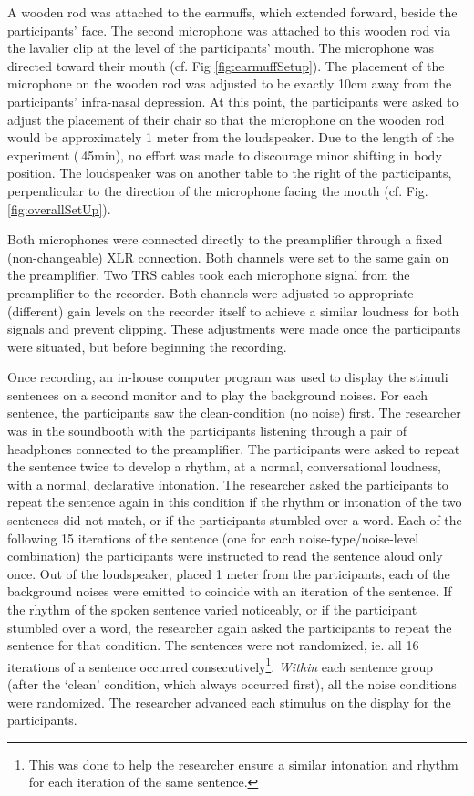 A wooden rod was attached to the earmuffs, which extended forward, beside the participants' face.  The second microphone was attached to this wooden rod via the lavalier clip at the level of the participants' mouth.  The microphone was directed toward their mouth (cf. Fig \ref{fig:earmuffSetup}).  
The placement of the microphone on the wooden rod was adjusted to be exactly 10cm away from the participants' infra-nasal depression.  At this point, the participants were asked to adjust the placement of their chair so that the microphone on the wooden rod would be approximately 1 meter from the loudspeaker. Due to the length of the experiment ($~$45min), no effort was made to discourage minor shifting in body position.  The loudspeaker was on another table to the right of the participants, perpendicular to the direction of the microphone facing the mouth (cf. Fig. \ref{fig:overallSetUp}).

Both microphones were connected directly to the preamplifier through a fixed (non-changeable) XLR connection.  Both channels were set to the same gain on the preamplifier.  Two TRS cables took each microphone signal from the preamplifier to the recorder.  Both channels were adjusted to appropriate (different) gain levels on the recorder itself to achieve a similar loudness for both signals and prevent clipping.  These adjustments were made once the participants were situated, but before beginning the recording.

Once recording, an in-house computer program was used to display the stimuli sentences on a second monitor and to play the background noises.  For each sentence, the participants saw the clean-condition (no noise) first.  The researcher was in the soundbooth with the participants listening through a pair of headphones connected to the preamplifier.  The participants were asked to repeat the sentence twice to develop a rhythm, at a normal, conversational loudness, with a normal, declarative intonation.  The researcher asked the participants to repeat the sentence again in this condition if the rhythm or intonation of the two sentences did not match, or if the participants stumbled over a word.  Each of the following 15 iterations of the sentence (one for each noise-type/noise-level combination) the participants were instructed to read the sentence aloud only once.  Out of the loudspeaker, placed 1 meter from the participants, each of the background noises were emitted to coincide with an iteration of the sentence.  If the rhythm of the spoken sentence varied noticeably, or if the participant stumbled over a word, the researcher again asked the participants to repeat the sentence for that condition.  The sentences were not randomized, ie. all 16 iterations of a sentence occurred consecutively\footnote{This was done to help the researcher ensure a similar intonation and rhythm for each iteration of the same sentence.}. \textit{Within} each sentence group (after the `clean' condition, which always occurred first), all the noise conditions were randomized. The researcher advanced each stimulus on the display for the participants.

